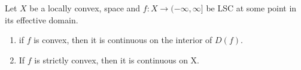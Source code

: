 \begin{cor} Let $X$ be a locally convex, space and $f:X \to (-\infty,\infty]$ be LSC at some point in its effective domain. 
    \begin{enumerate}
        \item if $f$ is convex, then it is continuous on the interior of $D(f)$. 
        \item If $f$ is strictly convex, then it is continuous on X. 
    \end{enumerate} 
\end{cor}